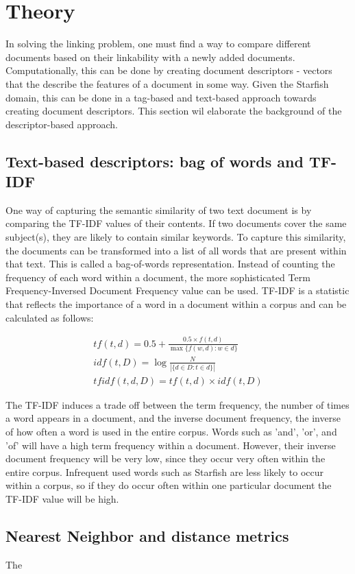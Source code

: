 \section{Theory}

In solving the linking problem, one must find a way to compare different documents based on their linkability with a newly added documents. Computationally, this can be done by creating document descriptors - vectors that the describe the features of a document in some way. Given the Starfish domain, this can be done in a tag-based and text-based approach towards creating document descriptors. This section wil elaborate the background of the descriptor-based approach. 

\subsection{Text-based descriptors: bag of words and TF-IDF}
One way of capturing the semantic similarity of two text document is by comparing the TF-IDF values of their contents. If two documents cover the same subject(s), they are likely to contain similar keywords. To capture this similarity, the documents can be transformed into a list of all words that are present within that text. This is called a bag-of-words representation. Instead of counting the frequency of each word within a document, the more sophisticated Term Frequency-Inversed Document Frequency value can be used. TF-IDF is a statistic that reflects the importance of a word in a document within a corpus and can be calculated as follows:

\begin{align}
\nonumber {tf}(t,d) = 0.5 + \frac{0.5 \times {f}(t, d)}{\max\{{f}(w, d):w \in d\}}\\
\nonumber {idf}(t, D) =  \log \frac{N}{|\{d \in D: t \in d\}|}\\
\nonumber {tfidf}(t,d,D) = {tf}(t,d) \times {idf}(t, D)
\end{align}

The TF-IDF induces a trade off between the term frequency, the number of times a word appears in a document, and the inverse document frequency, the inverse of how often a word is used in the entire corpus. Words such as 'and', 'or', and 'of' will have a high term frequency within a document. However, their inverse document frequency will be very low, since they occur very often within the entire corpus. Infrequent used words such as Starfish are less likely to occur within a corpus, so if they do occur often within one particular document the TF-IDF value will be high. 

\subsection{Nearest Neighbor and distance metrics}
The 
